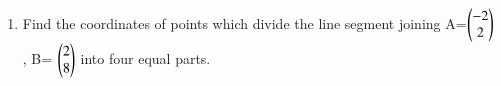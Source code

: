 \renewcommand{\theequation}{\theenumi}
\begin{enumerate}[label=\arabic*.,ref=\thesubsubsection.\theenumi]

\item Find the coordinates of points which divide the line segment joining A=$\begin{pmatrix}-2\\2\end{pmatrix}$ , B= $\begin{pmatrix}2\\8\end{pmatrix}$ into four equal parts.

\end{enumerate} 